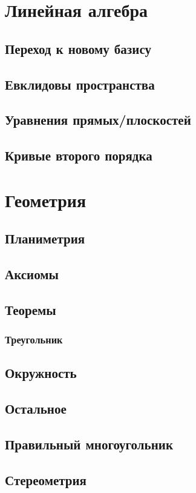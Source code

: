 
\section{Линейная алгебра}

\subsection{Переход к новому базису}

\subsection{Евклидовы пространства}

\subsection{Уравнения прямых/плоскостей}

\subsection{Кривые второго порядка}


\section{Геометрия}

\subsection{Планиметрия}

\subsection{Аксиомы}

\subsection{Теоремы}

\subsubsection{Треугольник}

\subsection{Окружность}

\subsection{Остальное}

\subsection{Правильный многоугольник}

\subsection{Стереометрия}